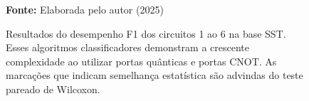 \begin{figure}
\caption{Resultados do desempenho F1 dos circuitos 1 ao 6 na base \gls{SST}. Esses algoritmos classificadores demonstram a crescente complexidade ao utilizar portas quânticas e portas CNOT. As marcações que indicam semelhança estatística são advindas do teste pareado de Wilcoxon.}
\label{fig:f1:sst:g1}
     \centering
    \centering

      \par\medskip\ABNTEXfontereduzida\selectfont\textbf{Fonte:} Elaborada pelo autor (2025) \par\medskip
\end{figure}